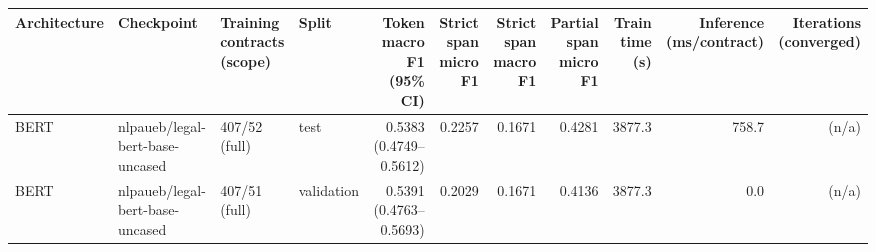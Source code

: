 \begin{tabular}{llllrrrrrrr}
\toprule
Architecture & Checkpoint & Training contracts (scope) & Split & Token macro F1 (95\% CI) & Strict span micro F1 & Strict span macro F1 & Partial span micro F1 & Train time (s) & Inference (ms/contract) & Iterations (converged) \\
\midrule
BERT & nlpaueb/legal-bert-base-uncased & 407/52 (full) & test & 0.5383 (0.4749--0.5612) & 0.2257 & 0.1671 & 0.4281 & 3877.3 & 758.7 &  (n/a) \\
BERT & nlpaueb/legal-bert-base-uncased & 407/51 (full) & validation & 0.5391 (0.4763--0.5693) & 0.2029 & 0.1671 & 0.4136 & 3877.3 & 0.0 &  (n/a) \\
\bottomrule
\end{tabular}

